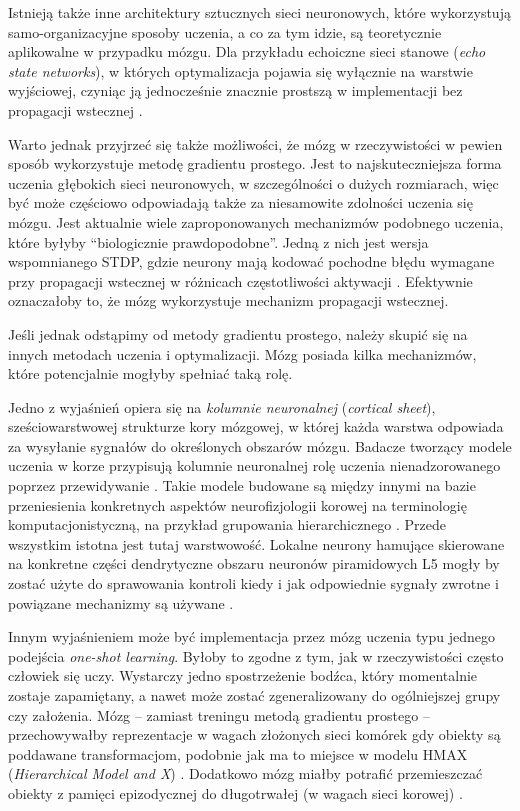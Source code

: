 Istnieją także inne architektury sztucznych sieci neuronowych, które wykorzystują samo-organizacyjne sposoby uczenia, a co za tym idzie, są teoretycznie aplikowalne w przypadku mózgu.
Dla przykładu echoiczne sieci stanowe (\emph{echo state networks}), w których optymalizacja pojawia się wyłącznie na warstwie wyjściowej, czyniąc ją jednocześnie znacznie prostszą w implementacji bez propagacji wstecznej \cite{jaeger2004harnessing}.

Warto jednak przyjrzeć się także możliwości, że mózg w rzeczywistości w pewien sposób wykorzystuje metodę gradientu prostego.
Jest to najskuteczniejsza forma uczenia głębokich sieci neuronowych, w szczególności o dużych rozmiarach, więc być może częściowo odpowiadają także za niesamowite zdolności uczenia się mózgu.
Jest aktualnie wiele zaproponowanych mechanizmów podobnego uczenia, które byłyby ``biologicznie prawdopodobne''.
Jedną z nich jest wersja wspomnianego STDP, gdzie neurony mają kodować pochodne błędu wymagane przy propagacji wstecznej w różnicach częstotliwości aktywacji \cite{hinton2016can}.
Efektywnie oznaczałoby to, że mózg wykorzystuje mechanizm propagacji wstecznej.

Jeśli jednak odstąpimy od metody gradientu prostego, należy skupić się na innych metodach uczenia i optymalizacji.
Mózg posiada kilka mechanizmów, które potencjalnie mogłyby spełniać taką rolę.

Jedno z wyjaśnień opiera się na \emph{kolumnie neuronalnej} (\emph{cortical sheet}), sześciowarstwowej strukturze kory mózgowej, w której każda warstwa odpowiada za wysyłanie sygnałów do określonych obszarów mózgu.
Badacze tworzący modele uczenia w korze przypisują kolumnie neuronalnej rolę uczenia nienadzorowanego poprzez przewidywanie \cite{o2014learning}.
Takie modele budowane są między innymi na bazie przeniesienia konkretnych aspektów neurofizjologii korowej na terminologię komputacjonistyczną, na przykład grupowania hierarchicznego \cite{rodriguez2004derivation}.
Przede wszystkim istotna jest tutaj warstwowość.
Lokalne neurony hamujące skierowane na konkretne części dendrytyczne obszaru neuronów piramidowych L5 mogły by zostać użyte do sprawowania kontroli kiedy i jak odpowiednie sygnały zwrotne i powiązane mechanizmy są używane \cite{marblestone2016toward}.

Innym wyjaśnieniem może być implementacja przez mózg uczenia typu jednego podejścia \emph{one-shot learning}.
Byłoby to zgodne z tym, jak w rzeczywistości często człowiek się uczy.
Wystarczy jedno spostrzeżenie bodźca, który momentalnie zostaje zapamiętany, a nawet może zostać zgeneralizowany do ogólniejszej grupy czy założenia.
Mózg -- zamiast treningu metodą gradientu prostego -- przechowywałby reprezentacje w wagach złożonych sieci komórek gdy obiekty są poddawane transformacjom, podobnie jak ma to miejsce w modelu HMAX (\emph{Hierarchical Model and X}) \cite{serre2007feedforward}.
Dodatkowo mózg miałby potrafić przemieszczać obiekty z pamięci epizodycznej do długotrwałej (w wagach sieci korowej) \cite{ji2007coordinated}.

